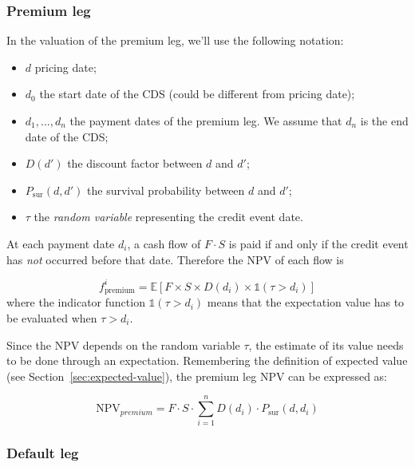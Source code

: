 \subsubsection{Premium leg}\label{premium-leg}

In the valuation of the premium leg, we'll use the following notation:

\begin{itemize}
\tightlist
\item $d$ pricing date;
\item $d_0$ the start date of the CDS (could be different from pricing date);
\item $d_1, ..., d_n$ the payment dates of the premium leg. We assume that $d_n$ is the end date of the CDS;
\item $D(d')$ the discount factor between $d$ and $d'$;
\item $P_{\textrm{sur}}(d, d')$ the survival probability between $d$ and $d'$;
\item $\tau$ the \emph{random variable} representing the credit event date.
\end{itemize}

At each payment date $d_i$, a cash flow of $F\cdot S$ is paid if and only if the credit event has \emph{not} occurred before that date. Therefore the NPV of each flow is

\begin{equation}
f_{\textrm{premium}}^i = \mathbb{E}\left[F\times S \times D(d_i) \times \mathbb{1}(\tau > d_i) \right]
\end{equation}
where the indicator function $\mathbb{1}(\tau > d_i)$ means that the expectation value has to be evaluated when $\tau > d_i$. 

Since the NPV depends on the random variable $\tau$, the estimate of its value needs to be done through an expectation.
Remembering the definition of expected value (see Section~\ref{sec:expected-value}), %
the premium leg NPV can be expressed as:

\begin{equation}
\textrm{NPV}_{premium} = F\cdot S \cdot \sum_{i=1}^{n} D(d_i) \cdot P_{\textrm{sur}}(d, d_i)
\end{equation}

\subsubsection{Default leg}
\label{default-leg}

